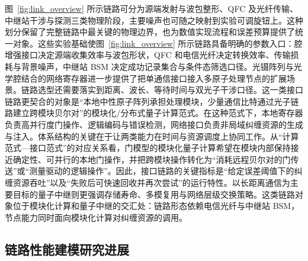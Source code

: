 图~\ref{fig:link_overview} 所示链路可分为源端发射与波包整形、QFC 及光纤传输、中继站干涉与探测三类物理阶段，主要噪声也可随之映射到实验可调旋钮上\cite{Ikuta2018PolarizationInsensitiveQFC,vanleent2022entangling,zhou2024longlived}。这种划分保留了完整链路中最关键的物理边界，也为数值实现流程和误差预算提供了统一对象\cite{Reiserer2022CavityEnhancedNetworkNodes,zhou2024longlived}。这些实验基础使图~\ref{fig:link_overview} 所示链路具备明确的参数入口：腔增强接口决定源端收集效率与波包形状，QFC 和电信光纤决定转换效率、传输损耗与背景噪声，中继站 BSM 决定成功记录集合与条件态筛选口径\cite{vanleent2020longdistance,vanleent2022entangling,zhou2024longlived}。光镊阵列与光学腔结合的网络寄存器进一步提供了把单通信接口接入多原子处理节点的扩展场景\cite{Hartung2024QuantumNetworkRegisterTweezerCavity,Covey2023QuantumNetworksNeutralAtomNodes}。链路选型还需要落实到距离、波长、等待时间与双光子干涉口径。这一类接口链路更契合的对象是“本地中性原子阵列承担处理模块，少量通信比特通过光子链路建立跨模块贝尔对”的模块化/分布式量子计算范式\cite{Jiang2007DistributedQC,Monroe2014ModularQC,Covey2023QuantumNetworksNeutralAtomNodes}。在这种范式下，本地寄存器负责高并行度门操作、逻辑编码与错误检测，网络接口负责非局域纠缠资源的生成与注入。体系结构的关键在于让两类能力在时间与资源调度上协同工作\cite{Bluvstein2024LogicalQuantumProcessor,Sinclair2024FaultTolerantOpticalInterconnectsNeutralAtoms}。从“计算范式—接口范式”的对应关系看，门模型的模块化量子计算希望在模块内部保持接近确定性、可并行的本地门操作，并把跨模块操作转化为“消耗远程贝尔对的门传送”或“测量驱动的逻辑操作”\cite{Monroe2014ModularQC,Jiang2007DistributedQC}。因此，接口链路的关键指标是“给定误差阈值下的纠缠资源吞吐”以及“失败后可快速回收并再次尝试”的运行特性\cite{Sinclair2024FaultTolerantOpticalInterconnectsNeutralAtoms}。以长距离通信为主要目标的量子中继则更强调存储寿命、多模复用与网络层级交换策略\cite{Azuma2023QuantumRepeatersReview}。这类链路对象位于模块化计算和量子中继的交汇处：链路形态依赖电信光纤与中继站 BSM，节点能力同时面向模块化计算对纠缠资源的调用\cite{Covey2023QuantumNetworksNeutralAtomNodes}。

\subsection{链路性能建模研究进展}

